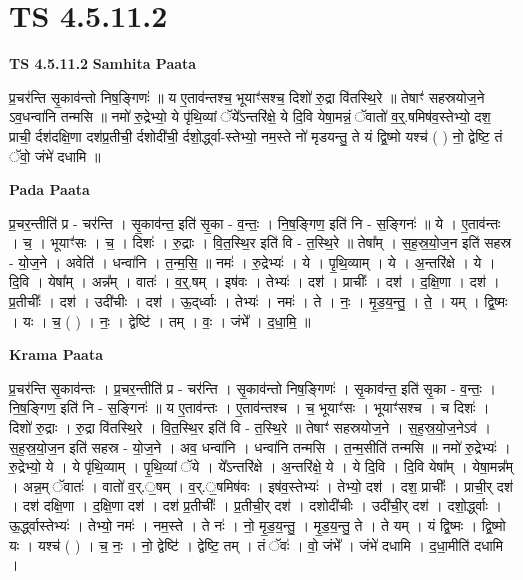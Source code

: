 \documentclass[17pt]{extarticle}
\begin{document}
\section{ TS 4.5.11.2 }

\textbf{TS 4.5.11.2 } \newline
\textbf{Samhita Paata} \newline

प्र॒चर॑न्ति सृ॒काव॑न्तो निष॒ङ्गिणः॑ ॥                                     य ए॒ताव॑न्तश्च॒ भूयाꣳ॑सश्च॒ दिशो॑ रु॒द्रा वि॑तस्थि॒रे ॥ तेषाꣳ॑ सहस्रयोज॒ने ऽव॒धन्वा॑नि तन्मसि ॥                                              नमो॑ रु॒द्रेभ्यो॒ ये पृ॑थि॒व्यां ॅये᳚ऽन्तरि॑क्षे॒ ये दि॒वि येषा॒मन्नं॒ ॅवातो॑ व॒र्॒.षमिष॑व॒स्तेभ्यो॒ दश॒ प्राची॒ र्दश॑दक्षि॒णा दश॑प्र॒तीची॒ र्दशोदी॑ची॒ र्दशो॒र्द्ध्वा-स्तेभ्यो॒ नम॒स्ते नो॑ मृडयन्तु॒ ते यं द्वि॒ष्मो यश्च॑ ( ) नो॒ द्वेष्टि॒ तं ॅवो॒ जंभे॑ दधामि ॥ \newline

\textbf{Pada Paata} \newline

प्र॒चर॒न्तीति॑ प्र - चर॑न्ति । सृ॒काव॑न्त॒ इति॑ सृ॒का - व॒न्तः॒ । नि॒ष॒ङ्गिण॒ इति॑ नि - स॒ङ्गिनः॑ ॥ ये । ए॒ताव॑न्तः । च॒ । भूयाꣳ॑सः । च॒ । दिशः॑ । रु॒द्राः । वि॒त॒स्थि॒र इति॑ वि - त॒स्थि॒रे ॥ तेषा᳚म् । स॒ह॒स्र॒यो॒ज॒न इति॑ सहस्र - यो॒ज॒ने । अवेति॑ । धन्वा॑नि । त॒न्म॒सि॒ ॥ नमः॑ । रु॒द्रेभ्यः॑ । ये । पृ॒थि॒व्याम् । ये । अ॒न्तरि॑क्षे । ये । दि॒वि । येषा᳚म् । अन्न᳚म् । वातः॑ । व॒र्॒.षम् । इष॑वः । तेभ्यः॑ । दश॑ । प्राचीः᳚ । दश॑ । द॒क्षि॒णा । दश॑ । प्र॒तीचीः᳚ । दश॑ । उदी॑चीः । दश॑ । ऊ॒द्‌र्ध्वाः । तेभ्यः॑ । नमः॑ । ते । नः॒ । मृ॒ड॒य॒न्तु॒ । ते॒ । यम् । द्वि॒ष्मः । यः । च॒ ( ) । नः॒ । द्वेष्टि॑ । तम् । वः॒ । जंभे᳚ । द॒धा॒मि॒ ॥  \newline


\textbf{Krama Paata} \newline

प्र॒चर॑न्ति सृ॒काव॑न्तः । प्र॒चर॒न्तीति॑ प्र - चर॑न्ति । सृ॒काव॑न्तो निष॒ङ्गिणः॑ । सृ॒काव॑न्त॒ इति॑ सृ॒का - व॒न्तः॒ । नि॒ष॒ङ्गिण॒ इति॑ नि - स॒ङ्गिनः॑ ॥ य ए॒ताव॑न्तः । ए॒ताव॑न्तश्च । च॒ भूयाꣳ॑सः । भूयाꣳ॑सश्च । च दिशः॑ । दिशो॑ रु॒द्राः । रु॒द्रा वि॑तस्थि॒रे । वि॒त॒स्थि॒र इति॑ वि - त॒स्थि॒रे ॥ तेषाꣳ॑ सहस्रयोज॒ने । स॒ह॒स्र॒यो॒ज॒नेऽव॑ । स॒ह॒स्र॒यो॒ज॒न इति॑ सहस्र - यो॒ज॒ने । अव॒ धन्वा॑नि । धन्वा॑नि तन्मसि । त॒न्म॒सीति॑ तन्मसि ॥ नमो॑ रु॒द्रेभ्यः॑ । रु॒द्रेभ्यो॒ ये । ये पृ॑थि॒व्याम् । पृ॒थि॒व्यां ॅये । ये᳚ऽन्तरि॑क्षे । अ॒न्तरि॑क्षे॒ ये । ये दि॒वि । दि॒वि येषा᳚म् । येषा॒मन्न᳚म् । अन्न॒म् ॅवातः॑ । वातो॑ व॒र्.॒षम् । व॒र्.॒षमिष॑वः । इष॑व॒स्तेभ्यः॑ । तेभ्यो॒ दश॑ । दश॒ प्राचीः᳚ । प्राची॒र् दश॑ । दश॑ दक्षि॒णा । द॒क्षि॒णा दश॑ । दश॑ प्र॒तीचीः᳚ । प्र॒तीची॒र् दश॑ । दशोदी॑चीः । उदी॑ची॒र् दश॑ । दशो॒र्द्ध्वाः । ऊ॒र्द्ध्वास्तेभ्यः॑ । तेभ्यो॒ नमः॑ । नम॒स्ते । ते नः॑ । नो॒ मृ॒ड॒य॒न्तु॒ । मृ॒ड॒य॒न्तु॒ ते । ते यम् । यं द्वि॒ष्मः । द्वि॒ष्मो यः । यश्च॑ ( ) । च॒ नः॒ । नो॒ द्वेष्टि॑ । द्वेष्टि॒ तम् । तं ॅवः॑ । वो॒ जंभे᳚ । जंभे॑ दधामि । द॒धा॒मीति॑ दधामि । \newline
\end{document}
